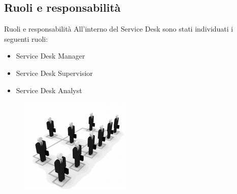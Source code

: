 \subsection{Ruoli e responsabilità}
\begin{frame}{Ruoli e responsabilità}
All'interno del Service Desk sono stati individuati i seguenti ruoli:
\begin{itemize}
\item{Service Desk Manager}
\item{Service Desk Supervisior}
\item{Service Desk Analyst}
\end{itemize}
\begin{figure}
\includegraphics[scale=0.4]{Images/Roles.png}
\end{figure}
\end{frame}

